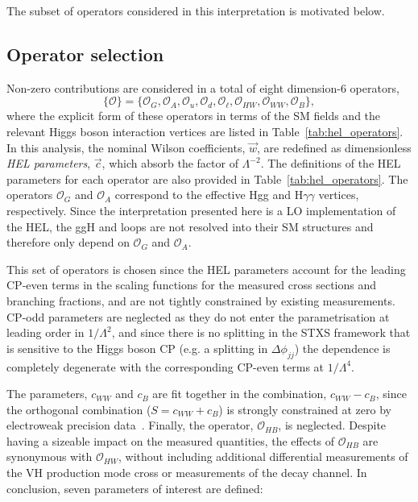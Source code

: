 \noindent
The subset of operators considered in this interpretation is motivated below.

\subsection{Operator selection}\label{sec:eft_operator}
Non-zero contributions are considered in a total of eight dimension-6 operators,
\begin{equation}
    \{\mathcal{O}\} = \{\mathcal{O}_G,\mathcal{O}_A,\mathcal{O}_u,\mathcal{O}_d,\mathcal{O}_\ell,\mathcal{O}_{HW},\mathcal{O}_{WW},\mathcal{O}_B\},
\end{equation}
\noindent
where the explicit form of these operators in terms of the SM fields and the relevant Higgs boson interaction vertices are listed in Table~\ref{tab:hel_operators}. In this analysis, the nominal Wilson coefficients, $\vec{w}$, are redefined as dimensionless \textit{HEL parameters}, $\vec{c}$, which absorb the factor of $\Lambda^{-2}$. The definitions of the HEL parameters for each operator are also provided in Table~\ref{tab:hel_operators}. The operators $\mathcal{O}_G$ and $\mathcal{O}_A$ correspond to the effective Hgg and H$\gamma\gamma$ vertices, respectively. Since the interpretation presented here is a LO implementation of the HEL, the ggH and \Hgg loops are not resolved into their SM structures and therefore only depend on $\mathcal{O}_G$ and $\mathcal{O}_A$.

This set of operators is chosen since the HEL parameters account for the leading CP-even terms in the scaling functions for the measured cross sections and branching fractions, and are not tightly constrained by existing measurements. CP-odd parameters are neglected as they do not enter the parametrisation at leading order in $1/\Lambda^2$, and since there is no splitting in the STXS framework that is sensitive to the Higgs boson CP (e.g. a splitting in $\Delta\phi_{jj}$) the dependence is completely degenerate with the corresponding CP-even terms at $1/\Lambda^4$.

The parameters, $c_{WW}$ and $c_B$ are fit together in the combination, $c_{WW}-c_B$, since the orthogonal combination ($S=c_{WW}+c_B$) is strongly constrained at zero by electroweak precision data~\cite{Ellis:2014jta}. Finally, the operator, $\mathcal{O}_{HB}$, is neglected. Despite having a sizeable impact on the measured quantities, the effects of $\mathcal{O}_{HB}$ are synonymous with $\mathcal{O}_{HW}$, without including additional differential measurements of the VH production mode cross or measurements of the \HZg decay channel. In conclusion, seven parameters of interest are defined:

